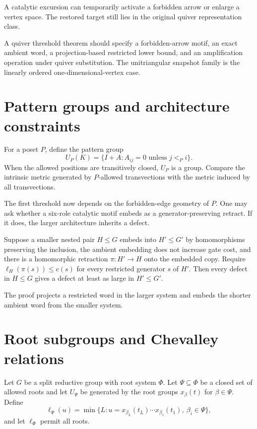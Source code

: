 A catalytic excursion can temporarily activate a forbidden arrow or enlarge a vertex space.  The restored target still lies in the original quiver representation class.

\begin{skeletonbox}
A quiver threshold theorem should specify a forbidden-arrow motif, an exact ambient word, a projection-based restricted lower bound, and an amplification operation under quiver substitution.  The unitriangular snapshot family is the linearly ordered one-dimensional-vertex case.
\end{skeletonbox}

\section{Pattern groups and architecture constraints}
For a poset $P$, define the pattern group
\[
U_P(K)
=
\{I+A:A_{ij}=0\text{ unless }j<_P i\}.
\]
When the allowed positions are transitively closed, $U_P$ is a group.  Compare the intrinsic metric generated by $P$-allowed transvections with the metric induced by all transvections.

The first threshold now depends on the forbidden-edge geometry of $P$.  One may ask whether a six-role catalytic motif embeds as a generator-preserving retract.  If it does, the larger architecture inherits a defect.

\begin{proposition}
Suppose a smaller nested pair $H\le G$ embeds into $H'\le G'$ by homomorphisms preserving the inclusion, the ambient embedding does not increase gate cost, and there is a homomorphic retraction $\pi:H'\to H$ onto the embedded copy.  Require $\ell_H(\pi(s))\le c(s)$ for every restricted generator $s$ of $H'$.  Then every defect in $H\le G$ gives a defect at least as large in $H'\le G'$.
\end{proposition}
The proof projects a restricted word in the larger system and embeds the shorter ambient word from the smaller system.

\section{Root subgroups and Chevalley relations}
Let $G$ be a split reductive group \cite{Carter1972,Humphreys1975} with root system $\Phi$.  Let $\Psi\subseteq\Phi$ be a closed set of allowed roots and let $U_\Psi$ be generated by the root groups $x_\beta(t)$ for $\beta\in\Psi$.  Define
\[
\ell_\Psi(u)
=
\min\{L:u=x_{\beta_L}(t_L)\cdots x_{\beta_1}(t_1),\ \beta_i\in\Psi\},
\]
and let $\ell_\Phi$ permit all roots.

